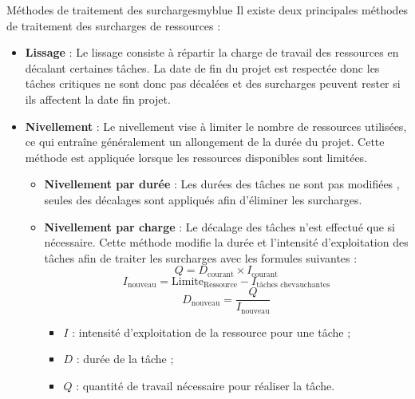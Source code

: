 \documentclass{article}
\begin{document}
\begin{prettyBox}{Méthodes de traitement des surcharges}{myblue}
Il existe deux principales méthodes de traitement des surcharges de ressources :

\begin{itemize}
    \item \textbf{Lissage} : Le lissage consiste à répartir la charge de travail des ressources en décalant certaines tâches.  
La date de fin du projet est respectée donc les tâches critiques ne sont donc pas décalées et des surcharges peuvent rester si ils affectent la date fin projet.
    \item \textbf{Nivellement} :  
    Le nivellement vise à limiter le nombre de ressources utilisées, ce qui entraîne généralement un allongement de la durée du projet.  
    Cette méthode est appliquée lorsque les ressources disponibles sont limitées.
    
    \begin{itemize}
        \item \textbf{Nivellement par durée} :  
        Les durées des tâches ne sont pas modifiées , seules des décalages sont appliqués afin d’éliminer les surcharges.
        
        \item \textbf{Nivellement par charge} :  
        Le décalage des tâches n’est effectué que si nécessaire. Cette méthode modifie la durée et l’intensité d’exploitation des tâches afin de traiter les surcharges avec
        les formules suivantes :
        \[
        Q = D_{\text{courant}} \times I_{\text{courant}}
        \]
        \[
        I_{\text{nouveau}} = \text{Limite}_{\text{Ressource}} - I_{\text{tâches chevauchantes}}
        \]
        \[
        D_{\text{nouveau}} = \frac{Q}{I_{\text{nouveau}}}
        \]
        \begin{itemize}
            \item $I$ : intensité d’exploitation de la ressource pour une tâche ;
            \item $D$ : durée de la tâche ;
            \item $Q$ : quantité de travail nécessaire pour réaliser la tâche.
        \end{itemize}
    \end{itemize}
\end{itemize}
\end{prettyBox}
\end{document}
